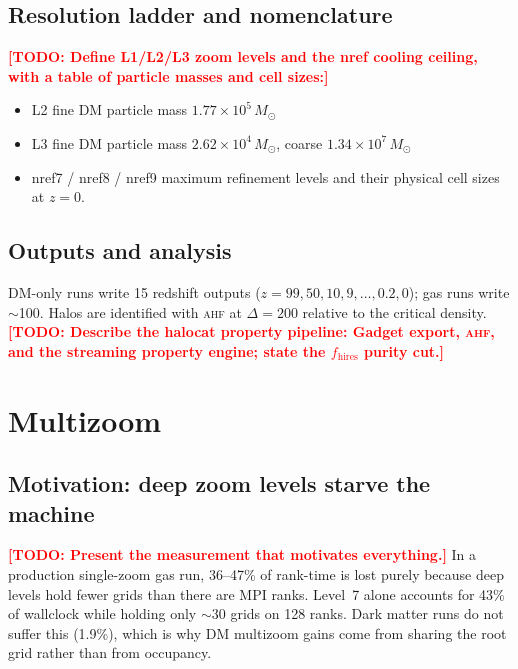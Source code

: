 \documentclass[twocolumn,linenumbers]{aastex631}
\newcommand{\todo}[1]{\textcolor{red}{\textbf{[TODO: #1]}}}
\newcommand{\measured}[1]{#1}
\newcommand{\Msun}{\ensuremath{M_\odot}}
\newcommand{\ahf}{\textsc{ahf}}
\begin{document}
\subsection{Resolution ladder and nomenclature}
\label{sec:ladder}

\todo{Define L1/L2/L3 zoom levels and the nref cooling ceiling, with a table
of particle masses and cell sizes:}
\begin{itemize}
\item L2 fine DM particle mass \measured{$1.77\times10^{5}\,\Msun$}
\item L3 fine DM particle mass \measured{$2.62\times10^{4}\,\Msun$},
      coarse \measured{$1.34\times10^{7}\,\Msun$}
\item nref7 / nref8 / nref9 maximum refinement levels and their physical
      cell sizes at $z=0$.
\end{itemize}

\subsection{Outputs and analysis}
\label{sec:outputs}

DM-only runs write 15 redshift outputs ($z = 99, 50, 10, 9, \ldots, 0.2, 0$);
gas runs write $\sim$100.
Halos are identified with \ahf{} \citep{Knollmann2009} at $\Delta = 200$
relative to the critical density.
\todo{Describe the halocat property pipeline: Gadget export, \ahf{}, and the
streaming property engine; state the $f_\mathrm{hires}$ purity cut.}

\section{Multizoom}
\label{sec:multizoom}

\subsection{Motivation: deep zoom levels starve the machine}
\label{sec:starvation}

\todo{Present the measurement that motivates everything.} In a production
single-zoom gas run, \measured{36--47\%} of rank-time is lost purely because
deep levels hold fewer grids than there are MPI ranks. Level~7 alone accounts
for \measured{43\%} of wallclock while holding only \measured{$\sim$30 grids
on 128 ranks}. Dark matter runs do not suffer this (\measured{1.9\%}), which
is why DM multizoom gains come from sharing the root grid rather than from
occupancy.
\end{document}
